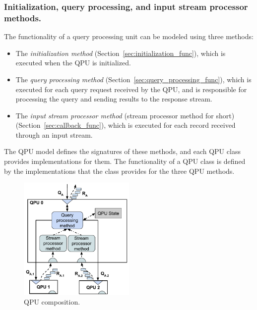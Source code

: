 \subsubsection{Initialization, query processing, and input stream processor methods.}
The functionality of a query processing unit can be modeled using three methods:
\begin{itemize}
  \item The \textit{initialization method} (Section~\ref{sec:initialization_func}), which is executed when the QPU is
  initialized.

  \item The \textit{query processing method} (Section~\ref{sec:query_processing_func}), which is executed for each
  query request received by the QPU, and is responsible for processing the query and sending results to the response stream.

  \item The \textit{input stream processor method} (stream processor method for short) (Section~\ref{sec:callback_func}), which is executed for each record
  received through an input stream.

\end{itemize}

The QPU model defines the signatures of these methods, and each QPU class provides implementations for them.
The functionality of a QPU class is defined by the implementations that the class provides for the three QPU methods.

\begin{figure}[H]
  \centering
    \includegraphics[width=0.5\textwidth]{./figures/design_pattern/qpu_abstraction.pdf}
  \caption{QPU composition.}
  \label{fig:qpu_abstraction}
\end{figure}

